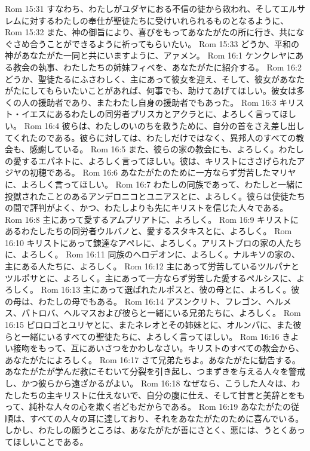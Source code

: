Rom 15:31  すなわち、わたしがユダヤにおる不信の徒から救われ、そしてエルサレムに対するわたしの奉仕が聖徒たちに受けいれられるものとなるように、
Rom 15:32  また、神の御旨により、喜びをもってあなたがたの所に行き、共になぐさめ合うことができるように祈ってもらいたい。
Rom 15:33  どうか、平和の神があなたがた一同と共にいますように、アァメン。
Rom 16:1  ケンクレヤにある教会の執事、わたしたちの姉妹フィベを、あなたがたに紹介する。
Rom 16:2  どうか、聖徒たるにふさわしく、主にあって彼女を迎え、そして、彼女があなたがたにしてもらいたいことがあれば、何事でも、助けてあげてほしい。彼女は多くの人の援助者であり、またわたし自身の援助者でもあった。
Rom 16:3  キリスト・イエスにあるわたしの同労者プリスカとアクラとに、よろしく言ってほしい。
Rom 16:4  彼らは、わたしのいのちを救うために、自分の首をさえ差し出してくれたのである。彼らに対しては、わたしだけではなく、異邦人のすべての教会も、感謝している。
Rom 16:5  また、彼らの家の教会にも、よろしく。わたしの愛するエパネトに、よろしく言ってほしい。彼は、キリストにささげられたアジヤの初穂である。
Rom 16:6  あなたがたのために一方ならず労苦したマリヤに、よろしく言ってほしい。
Rom 16:7  わたしの同族であって、わたしと一緒に投獄されたことのあるアンデロニコとユニアスとに、よろしく。彼らは使徒たちの間で評判がよく、かつ、わたしよりも先にキリストを信じた人々である。
Rom 16:8  主にあって愛するアムプリアトに、よろしく。
Rom 16:9  キリストにあるわたしたちの同労者ウルバノと、愛するスタキスとに、よろしく。
Rom 16:10  キリストにあって錬達なアペレに、よろしく。アリストブロの家の人たちに、よろしく。
Rom 16:11  同族のヘロデオンに、よろしく。ナルキソの家の、主にある人たちに、よろしく。
Rom 16:12  主にあって労苦しているツルパナとツルポサとに、よろしく。主にあって一方ならず労苦した愛するペルシスに、よろしく。
Rom 16:13  主にあって選ばれたルポスと、彼の母とに、よろしく。彼の母は、わたしの母でもある。
Rom 16:14  アスンクリト、フレゴン、ヘルメス、パトロバ、ヘルマスおよび彼らと一緒にいる兄弟たちに、よろしく。
Rom 16:15  ピロロゴとユリヤとに、またネレオとその姉妹とに、オルンパに、また彼らと一緒にいるすべての聖徒たちに、よろしく言ってほしい。
Rom 16:16  きよい接吻をもって、互にあいさつをかわしなさい。キリストのすべての教会から、あなたがたによろしく。
Rom 16:17  さて兄弟たちよ。あなたがたに勧告する。あなたがたが学んだ教にそむいて分裂を引き起し、つまずきを与える人々を警戒し、かつ彼らから遠ざかるがよい。
Rom 16:18  なぜなら、こうした人々は、わたしたちの主キリストに仕えないで、自分の腹に仕え、そして甘言と美辞とをもって、純朴な人々の心を欺く者どもだからである。
Rom 16:19  あなたがたの従順は、すべての人々の耳に達しており、それをあなたがたのために喜んでいる。しかし、わたしの願うところは、あなたがたが善にさとく、悪には、うとくあってほしいことである。
